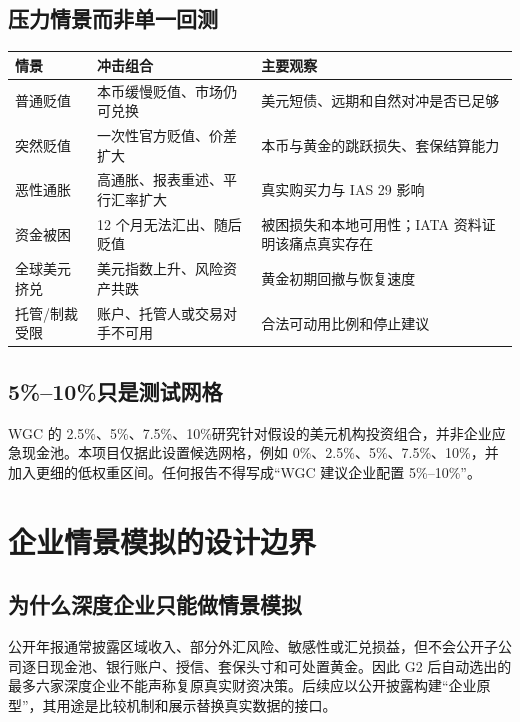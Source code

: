 \documentclass[UTF8,12pt,openany]{ctexbook}
\begin{document}
\section{压力情景而非单一回测}
\begin{longtable}{p{3.2cm}p{5.5cm}p{5.2cm}}
\toprule
\textbf{情景} & \textbf{冲击组合} & \textbf{主要观察}\\
\midrule
普通贬值 & 本币缓慢贬值、市场仍可兑换 & 美元短债、远期和自然对冲是否已足够\\
突然贬值 & 一次性官方贬值、价差扩大 & 本币与黄金的跳跃损失、套保结算能力\\
恶性通胀 & 高通胀、报表重述、平行汇率扩大 & 真实购买力与 IAS 29 影响\autocite{ifrsias29}\\
资金被困 & 12 个月无法汇出、随后贬值 & 被困损失和本地可用性；IATA 资料证明该痛点真实存在\autocite{iata2024blocked}\\
全球美元挤兑 & 美元指数上升、风险资产共跌 & 黄金初期回撤与恢复速度\\
托管/制裁受限 & 账户、托管人或交易对手不可用 & 合法可动用比例和停止建议\\
\bottomrule
\end{longtable}

\section{5\%--10\%只是测试网格}
WGC 的 2.5\%、5\%、7.5\%、10\%研究针对假设的美元机构投资组合，并非企业应急现金池\autocite{wgcportfolio}。本项目仅据此设置候选网格，例如 0\%、2.5\%、5\%、7.5\%、10\%，并加入更细的低权重区间。任何报告不得写成“WGC 建议企业配置 5\%--10\%”。

\chapter{企业情景模拟的设计边界}

\section{为什么深度企业只能做情景模拟}
公开年报通常披露区域收入、部分外汇风险、敏感性或汇兑损益，但不会公开子公司逐日现金池、银行账户、授信、套保头寸和可处置黄金。因此 G2 后自动选出的最多六家深度企业不能声称复原真实财资决策。后续应以公开披露构建“企业原型”，其用途是比较机制和展示替换真实数据的接口。
\end{document}
